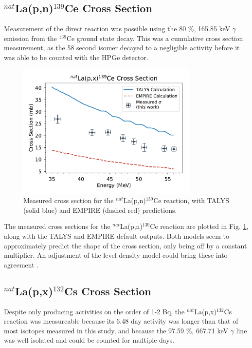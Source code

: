 \documentclass[aps,twocolumn,secnumarabic,balancelastpage,amsmath,amssymb,nofootinbib,floatfix]{revtex4-1}
\begin{document}
\subsection{$^{nat}$La(p,n)$^{139}$Ce Cross Section}

Measurement of the direct reaction was possible using the 80 \%, 165.85 keV $\gamma$ emission from the $^{139}$Ce ground state decay.  This was a cumulative cross section measurement, as the 58 second isomer decayed to a negligible activity before it was able to be counted with the HPGe detector.

\begin{figure}[htb]
\includegraphics[width=9cm]{cross_sections/139CE}
\caption{Measured cross section for the $^{nat}$La(p,n)$^{139}$Ce reaction, with TALYS (solid blue) and EMPIRE (dashed red) predictions.
}
\label{fig:139CE}
\end{figure}

The measured cross sections for the $^{nat}$La(p,n)$^{139}$Ce reaction are plotted in Fig. \ref{fig:139CE}, along with the TALYS and EMPIRE default outputs.  Both models seem to approximately predict the shape of the cross section, only being off by a constant multiplier.  An adjustment of the level density model could bring these into agreement \cite{BRINK1957215}.

\subsection{$^{nat}$La(p,x)$^{132}$Cs Cross Section}

Despite only producing activities on the order of 1-2 Bq, the $^{nat}$La(p,x)$^{132}$Cs reaction was measureable because its 6.48 day activity was longer than that of most isotopes measured in this study, and because the 97.59 \%, 667.71 keV $\gamma$ line was well isolated and could be counted for multiple days.
\end{document}
